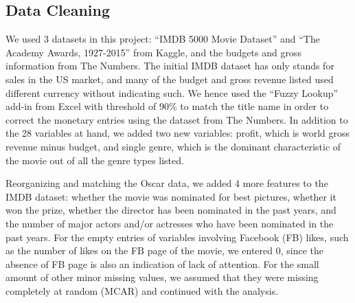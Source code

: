 \documentclass[12pt]{article}
\begin{document}
\subsection{Data Cleaning}
We used 3 datasets in this project: “IMDB 5000 Movie Dataset” and “The Academy Awards, 1927-2015” from Kaggle, and the budgets and gross information from The Numbers. The initial IMDB dataset has only stands for sales in the US market, and many of the budget and gross revenue listed used different currency without indicating such. We hence used the “Fuzzy Lookup” add-in from Excel with threshold of 90\% to match the title name in order to correct the monetary entries using the dataset from The Numbers. In addition to the 28 variables at hand, we added two new variables: profit, which is world gross revenue minus budget, and single genre, which is the dominant characteristic of the movie out of all the genre types listed. \par
Reorganizing and matching the Oscar data, we added 4 more features to the IMDB dataset: whether the movie was nominated for best pictures, whether it won the prize, whether the director has been nominated in the past years, and the number of major actors and/or actresses who have been nominated in the past years. 
For the empty entries of variables involving Facebook (FB) likes, such as the number of likes on the FB page of the movie, we entered 0, since the absence of FB page is also an indication of lack of attention. For the small amount of other minor missing values, we assumed that they were missing completely at random (MCAR) and continued with the analysis.
\end{document}
